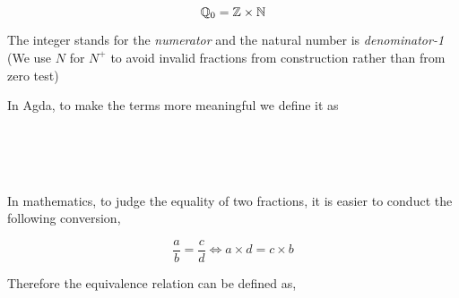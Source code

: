 $$\mathbb{Q}_0 = \mathbb{Z} \times \mathbb{N}$$

The integer stands for the \emph{numerator} and the natural number is
\emph{denominator-1} (We use $N$ for $N^{+}$ to avoid invalid
fractions from construction rather than from zero test)

In Agda, to make the terms more meaningful we define it as

\begin{code}
\\
\>  \AgdaSymbol{:}  \<%
\\
\>[-1]\<[2]%
\>[2] \AgdaSymbol{:} \AgdaSymbol{(} \AgdaSymbol{:} \AgdaSymbol{)}  \AgdaSymbol{(} \AgdaSymbol{:} \AgdaSymbol{)}  \<%
\\
\end{code}

In mathematics, to judge the equality of two fractions, it is easier to conduct the following conversion,

$$ \frac{a}{b} = \frac{c}{d} \iff a \times d = c \times b $$

Therefore the equivalence relation can be defined as,

\begin{code}
\\
\>\AgdaFunction{\_*\_} \AgdaSymbol{:}     \<%
\\
\>\AgdaSymbol{(}\AgdaInductiveConstructor{+} \AgdaSymbol{)} \AgdaFunction{*}  \AgdaSymbol{=} \AgdaInductiveConstructor{+} \AgdaSymbol{(}  \AgdaSymbol{)}\<%
\\
\>\AgdaSymbol{(} \AgdaSymbol{)} \AgdaFunction{*}  \AgdaSymbol{=} \AgdaInductiveConstructor{+} \<%
\\
\>\AgdaSymbol{(} \AgdaSymbol{)} \AgdaFunction{*}   \AgdaSymbol{=}  \AgdaSymbol{(}     \AgdaSymbol{)}\<%
\\
%
\\
\> \<[35]%
\>[35]\AgdaSymbol{:}   \AgdaSymbol{\_}\<%
\\
\>\AgdaSymbol{(}  \AgdaSymbol{)}  \AgdaSymbol{(}  \AgdaSymbol{)} \AgdaSymbol{=} \<[31]%
\>[31] \AgdaFunction{*}     \AgdaFunction{*}  \<%
\\
\end{code}

